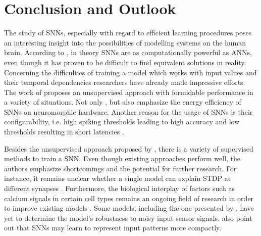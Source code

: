 \section{Conclusion and Outlook}
\label{sec:conclusion}

The study of \acp{SNN}, especially with regard to efficient learning procedures poses an interesting insight into the possibilities of modelling
systems on the human brain.
According to \authorsANNSNNconversion{} \cite{ANN_SNN_conversion}, in theory \acp{SNN} are as computationally powerful as \acp{ANN}, 
even though it has proven to be difficult to find equivalent solutions in reality.
Concerning the difficulties of training a model which works with input values and their temporal dependencies researchers have already made 
impressive efforts.
The work of \authorsSNN{} \cite{SNN} proposes an unsupervised approach with formidable performance in a variety of situations.
Not only \authorsSNN{} \cite{SNN}, but also \authorsSynapticPlasticity{} \cite{Synaptic_plasticity} emphasize the energy efficiency of 
\acp{SNN} on neuromorphic hardware.
Another reason for the usage of \acp{SNN} is their configurability, 
i.e. high spiking thresholds leading to high accuracy and low thresholds resulting in short latencies \cite{ANN_SNN_conversion}.

Besides the unsupervised approach proposed by \authorsSNN{} \cite{SNN}, there is a variety of supervised methods to train a \ac{SNN}.
Even though existing approaches perform well, the authors emphasize shortcomings and the potential for further research.
For instance, it remains unclear whether a single model can explain \ac{STDP} at different synapses \cite{STDP_hebbian}.
Furthermore, the biological interplay of factors such as calcium signals in certain cell types remains an ongoing field of research 
in order to improve existing models \cite{STDP_hebbian}.
Some models, including the one presented by \authorsObjectDetectionSNN{} \cite{object_detection_SNN}, have yet to determine the model's robustness to noisy input sensor signals.
\authorsObjectDetectionSNN{} \cite{object_detection_SNN} also point out that \acp{SNN} may learn to represent input patterns more compactly.

